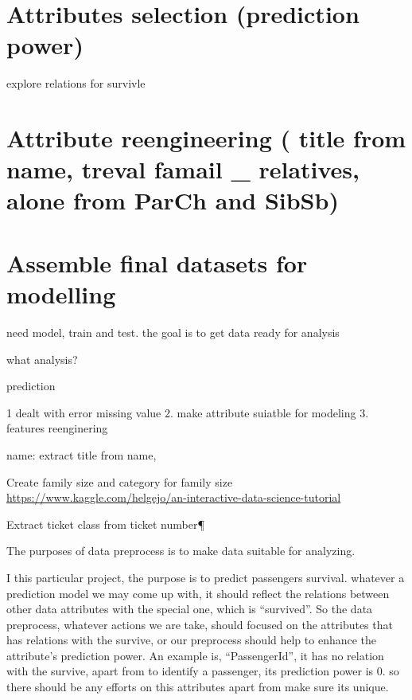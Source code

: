 \documentclass[
]{book}
\begin{document}
\hypertarget{attributes-selection-prediction-power}{%
\section{Attributes selection (prediction power)}\label{attributes-selection-prediction-power}}

explore relations for survivle

\hypertarget{attribute-reengineering-title-from-name-treval-famail-_-relatives-alone-from-parch-and-sibsb}{%
\section{Attribute reengineering ( title from name, treval famail \_ relatives, alone from ParCh and SibSb)}\label{attribute-reengineering-title-from-name-treval-famail-_-relatives-alone-from-parch-and-sibsb}}

\hypertarget{assemble-final-datasets-for-modelling}{%
\section{Assemble final datasets for modelling}\label{assemble-final-datasets-for-modelling}}

need model, train and test.
the goal is to get data ready for analysis

what analysis?

prediction

1 dealt with error missing value
2. make attribute suiatble for modeling
3. features reenginering

name: extract title from name,

Create family size and category for family size
\url{https://www.kaggle.com/helgejo/an-interactive-data-science-tutorial}

Extract ticket class from ticket number¶

The purposes of data preprocess is to make data suitable for analyzing.

I this particular project, the purpose is to predict passengers survival. whatever a prediction model we may come up with, it should reflect the relations between other data attributes with the special one, which is ``survived''. So the data preprocess, whatever actions we are take, should focused on the attributes that has relations with the survive, or our preprocess should help to enhance the attribute's prediction power. An example is, ``PassengerId'', it has no relation with the survive, apart from to identify a passenger, its prediction power is 0. so there should be any efforts on this attributes apart from make sure its unique.
\end{document}
